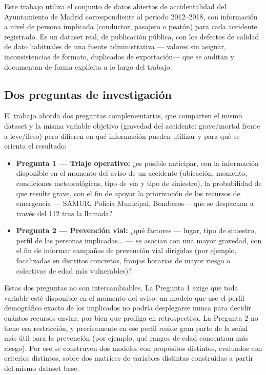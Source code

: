\documentclass[11pt,a4paper]{article}
\begin{document}
Este trabajo utiliza el conjunto de datos abiertos de accidentalidad del Ayuntamiento de Madrid correspondiente al periodo 2012--2018, con información a nivel de persona implicada (conductor, pasajero o peatón) para cada accidente registrado. Es un dataset real, de publicación pública, con los defectos de calidad de dato habituales de una fuente administrativa --- valores sin asignar, inconsistencias de formato, duplicados de exportación--- que se auditan y documentan de forma explícita a lo largo del trabajo.

\subsection{Dos preguntas de investigación}

El trabajo aborda dos preguntas complementarias, que comparten el mismo dataset y la misma variable objetivo (gravedad del accidente: grave/mortal frente a leve/ileso) pero difieren en qué información pueden utilizar y para qué se orienta el resultado:

\begin{itemize}
\item \textbf{Pregunta 1 --- Triaje operativo:} ¿es posible anticipar, con la información disponible en el momento del aviso de un accidente (ubicación, momento, condiciones meteorológicas, tipo de vía y tipo de siniestro), la probabilidad de que resulte grave, con el fin de apoyar la priorización de los recursos de emergencia --- SAMUR, Policía Municipal, Bomberos--- que se despachan a través del 112 tras la llamada?
\item \textbf{Pregunta 2 --- Prevención vial:} ¿qué factores --- lugar, tipo de siniestro, perfil de las personas implicadas... --- se asocian con una mayor gravedad, con el fin de informar campañas de prevención vial dirigidas (por ejemplo, focalizadas en distritos concretos, franjas horarias de mayor riesgo o colectivos de edad más vulnerables)?
\end{itemize}

Estas dos preguntas no son intercambiables. La Pregunta 1 exige que toda variable esté disponible en el momento del aviso: un modelo que use el perfil demográfico exacto de los implicados no podría desplegarse nunca para decidir cuántos recursos enviar, por bien que prediga en retrospectiva. La Pregunta 2 no tiene esa restricción, y precisamente en ese perfil reside gran parte de la señal más útil para la prevención (por ejemplo, qué rangos de edad concentran más riesgo). Por eso se construyen dos modelos con propósitos distintos, evaluados con criterios distintos, sobre dos matrices de variables distintas construidas a partir del mismo dataset base.
\end{document}
